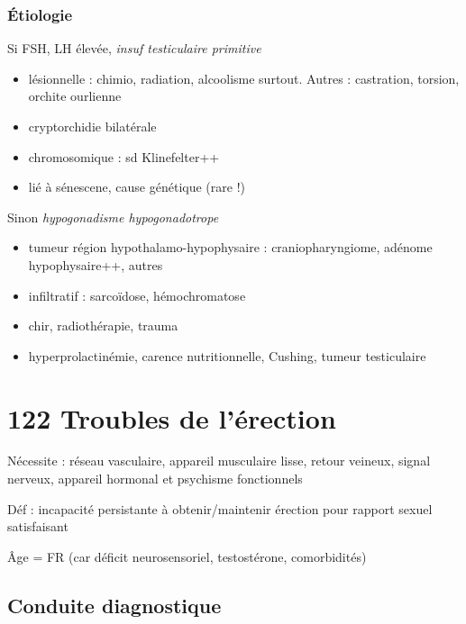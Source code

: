 \documentclass{book}
\begin{document}
\subsubsection{Étiologie}
\label{sec:org9982f08}
Si FSH, LH élevée, \emph{insuf testiculaire primitive} 
\begin{itemize}
\item lésionnelle : chimio, radiation, alcoolisme surtout. Autres : castration,
torsion, orchite ourlienne
\item cryptorchidie bilatérale
\item chromosomique : sd Klinefelter++
\item lié à sénescene, cause génétique (rare !)
\end{itemize}
Sinon \emph{hypogonadisme hypogonadotrope}
\begin{itemize}
\item tumeur région hypothalamo-hypophysaire : craniopharyngiome, adénome
hypophysaire++, autres
\item infiltratif : sarcoïdose, hémochromatose
\item chir, radiothérapie, trauma
\item hyperprolactinémie, carence nutritionnelle, Cushing, tumeur testiculaire
\end{itemize}

\section{122 \textdagger{} Troubles de l'érection}
\label{sec:orgb0bc8c2}
Nécessite : réseau vasculaire, appareil musculaire lisse, retour veineux, signal  nerveux,
appareil hormonal et psychisme fonctionnels

Déf : incapacité persistante à obtenir/maintenir érection pour rapport sexuel satisfaisant

Âge = FR (car déficit neurosensoriel, \inc testostérone, comorbidités)

\subsection{Conduite  diagnostique}
\label{sec:org01980da}
\end{document}
